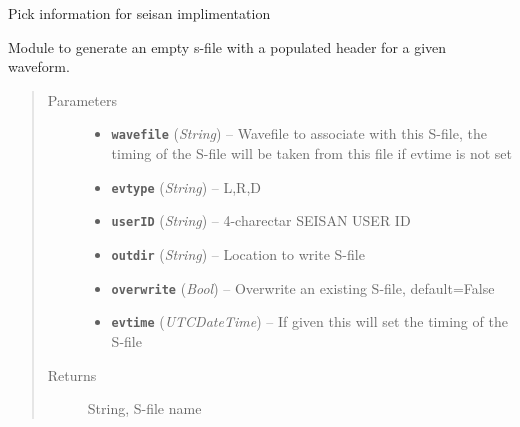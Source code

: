 \documentclass[a4paper,10pt,english]{sphinxmanual}
\begin{document}

\begin{fulllineitems}
\label{utils:Sfile_util.PICK}
Pick information for seisan implimentation

\end{fulllineitems}


\begin{fulllineitems}
\label{utils:Sfile_util.blanksfile}
Module to generate an empty s-file with a populated header for a given
waveform.
\begin{quote}\begin{description}
\item[{Parameters}] \leavevmode\begin{itemize}
\item {} 
\textbf{\texttt{wavefile}} (\emph{String}) -- Wavefile to associate with this S-file, the timing of the
S-file will be taken from this file if evtime is not set

\item {} 
\textbf{\texttt{evtype}} (\emph{String}) -- L,R,D

\item {} 
\textbf{\texttt{userID}} (\emph{String}) -- 4-charectar SEISAN USER ID

\item {} 
\textbf{\texttt{outdir}} (\emph{String}) -- Location to write S-file

\item {} 
\textbf{\texttt{overwrite}} (\emph{Bool}) -- Overwrite an existing S-file, default=False

\item {} 
\textbf{\texttt{evtime}} (\emph{UTCDateTime}) -- If given this will set the timing of the S-file

\end{itemize}

\item[{Returns}] \leavevmode
String, S-file name

\end{description}\end{quote}

\end{fulllineitems}
\end{document}
